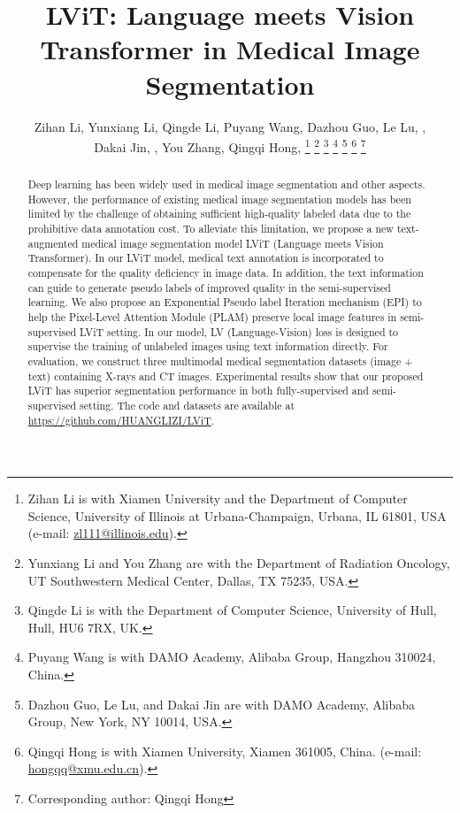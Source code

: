 \documentclass[lettersize,journal]{IEEEtran}
\begin{document}
\title{LViT: Language meets Vision Transformer in Medical Image Segmentation}
\author{Zihan Li, Yunxiang Li, Qingde Li, Puyang Wang, Dazhou Guo, Le Lu, , \\Dakai Jin, , You Zhang, Qingqi Hong, 
\thanks{Zihan Li is with Xiamen University and the Department of Computer Science, University of Illinois at Urbana-Champaign, Urbana, IL 61801, USA (e-mail: \href{zl111@illinois.edu}{zl111@illinois.edu}).}
\thanks{Yunxiang Li and You Zhang are with the Department of Radiation Oncology, UT Southwestern Medical Center, Dallas, TX 75235, USA.}
\thanks{Qingde Li is with the Department of Computer Science, University of Hull, Hull, HU6 7RX, UK.}
\thanks{Puyang Wang is with DAMO Academy, Alibaba Group, Hangzhou 310024, China.}
\thanks{Dazhou Guo, Le Lu, and Dakai Jin are with DAMO Academy, Alibaba Group, New York, NY 10014, USA.}
\thanks{Qingqi Hong is with Xiamen University, Xiamen 361005, China. (e-mail:
\href{hongqq@xmu.edu.cn}{hongqq@xmu.edu.cn}).}
\thanks{Corresponding author: Qingqi Hong}
}
\maketitle
\begin{abstract}
Deep learning has been widely used in medical image segmentation and other aspects. However, the performance of existing medical image segmentation models has been limited by the challenge of obtaining sufficient high-quality labeled data due to the prohibitive data annotation cost. To alleviate this limitation, we propose a new text-augmented medical image segmentation model LViT (Language meets Vision Transformer). In our LViT model, medical text annotation is incorporated to compensate for the quality deficiency in image data. In addition, the text information can guide to generate pseudo labels of improved quality in the semi-supervised learning. We also propose an Exponential Pseudo label Iteration mechanism (EPI) to help the Pixel-Level Attention Module (PLAM) preserve local image features in semi-supervised LViT setting. In our model, LV (Language-Vision) loss is designed to supervise the training of unlabeled images using text information directly. For evaluation, we construct three multimodal medical segmentation datasets (image + text) containing X-rays and CT images. Experimental results show that our proposed LViT has superior segmentation performance in both fully-supervised and semi-supervised setting. The code and datasets are available at {\href{https://github.com/HUANGLIZI/LViT}{https://github.com/HUANGLIZI/LViT}}.
\end{abstract}
\end{document}
